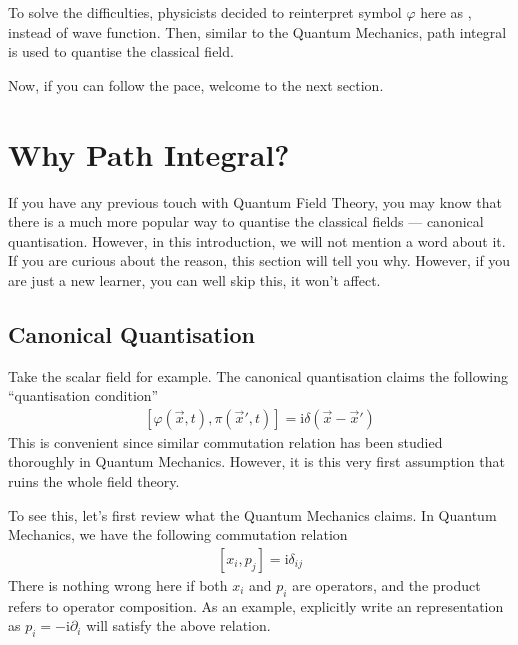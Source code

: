 \documentclass[letterpaper,10pt,english]{sphinxmanual}
\begin{document}
To solve the difficulties, physicists decided to reinterpret symbol \(\varphi\) here as , instead of wave function. Then, similar to the Quantum Mechanics, path integral is used to quantise the classical field.

Now, if you can follow the pace, welcome to the next section.


\section{Why Path Integral?}
\label{\detokenize{intro_why:why-path-integral}}\label{\detokenize{intro_why::doc}}
If you have any previous touch with Quantum Field Theory, you may know that there is a much more popular way to quantise the classical fields — canonical quantisation. However, in this introduction, we will not mention a word about it. If you are curious about the reason, this section will tell you why. However, if you are just a new learner, you can well skip this, it won’t affect.


\subsection{Canonical Quantisation}
\label{\detokenize{intro_why:canonical-quantisation}}
Take the scalar field for example. The canonical quantisation claims the following “quantisation condition”
\begin{equation*}
\begin{split}[\varphi(\vec x, t), \pi(\vec x', t)] = \mathrm i\delta(\vec x-\vec x')\end{split}
\end{equation*}
This is convenient since similar commutation relation has been studied thoroughly in Quantum Mechanics. However, it is this very first assumption that ruins the whole field theory.

To see this, let’s first review what the Quantum Mechanics claims. In Quantum Mechanics, we have the following commutation relation
\begin{equation*}
\begin{split}[x_i, p_j] = \mathrm i\delta_{ij}\end{split}
\end{equation*}
There is nothing wrong here if both \(x_i\) and \(p_i\) are operators, and the product refers to operator composition. As an example, explicitly write an representation as \(p_i = -\mathrm i\partial_i\) will satisfy the above relation.
\end{document}

